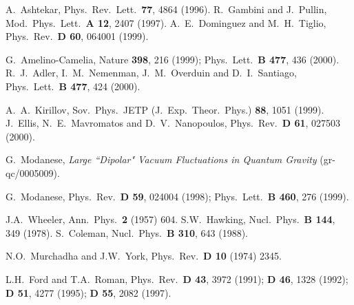 \documentclass[a4paper,11pt]{article}
\begin{document}
\begin{thebibliography}{9}


A.\ Ashtekar, Phys.\ Rev.\ Lett.\ {\bf 77}, 4864 (1996).
R.\ Gambini and J.\ Pullin, Mod.\ Phys.\ Lett.\ {\bf A 12}, 
2407 (1997).
A.\ E.\ Dominguez and M.\ H.\ Tiglio, Phys.\ Rev.\ 
{\bf D 60}, 064001 (1999).

G.\ Amelino-Camelia, Nature {\bf 398}, 216 (1999); 
Phys.\ Lett.\ {\bf B 477}, 436 (2000).
R.\ J.\ Adler, I.\ M.\ Nemenman, J.\ M.\ Overduin and D.\ 
I.\ Santiago, Phys.\ Lett.\ {\bf B 477}, 424 (2000).

A.\ A.\ Kirillov, Sov.\ Phys.\ JETP (J.\ Exp.\ Theor.\
Phys.) {\bf 88}, 1051 (1999). 
J.\ Ellis, N.\ E.\ Mavromatos and D.\ V.\ Nanopoulos,
Phys.\ Rev.\ {\bf D 61}, 027503 (2000).

\bibitem{vdf}
G.\ Modanese, {\it Large ``Dipolar" Vacuum Fluctuations 
in Quantum Gravity} (gr-qc/0005009).

\bibitem{pre}
G.\ Modanese, Phys.\ Rev.\ {\bf D 59}, 024004 (1998);
Phys.\ Lett.\ {\bf B 460}, 276 (1999).

\bibitem{haw}
J.A.\ Wheeler, Ann.\ Phys.\ {\bf 2} (1957) 604.
S.W.\ Hawking, Nucl.\ Phys.\ {\bf B 144}, 349 (1978). 
S.\ Coleman, Nucl.\ Phys.\ {\bf B 310}, 643 (1988).

\bibitem{mur}
N.O.\ Murchadha and J.W.\ York, Phys.\ Rev.\ {\bf D 10} 
(1974) 2345.


L.H.\ Ford and T.A.\ Roman, Phys.\ Rev.\ {\bf D 43}, 3972 
(1991); {\bf D 46}, 1328 (1992); {\bf D 51}, 4277 (1995); 
{\bf D 55}, 2082 (1997).


\end{thebibliography}
\end{document}
